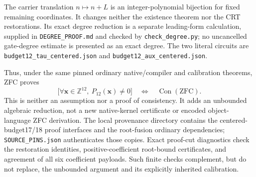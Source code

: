 The carrier translation $n\mapsto n+L$ is an integer-polynomial
bijection for fixed remaining coordinates.  It changes neither the
existence theorem nor the CRT restorations.  Its exact degree reduction
is a separate leading-form calculation, supplied in
\texttt{DEGREE\_PROOF.md} and checked by \texttt{check\_degree.py};
no uncancelled gate-degree estimate is presented as an exact degree.
The two literal circuits are \texttt{budget12\_tau\_centered.json}
and \texttt{budget12\_aux\_centered.json}.

Thus, under the same pinned ordinary native/compiler and calibration
theorems, ZFC proves
\[
 \bigl[\forall\mathbf x\in\mathbb Z^{12},\ P_{12}(\mathbf x)\ne0\bigr]
 \quad\Longleftrightarrow\quad \operatorname{Con}(\mathrm{ZFC}).
\]
This is neither an assumption nor a proof of consistency.  It adds an
unbounded algebraic reduction, not a new native-kernel certificate or
encoded object-language ZFC derivation.  The local provenance directory
contains the centered-budget17/18 proof interfaces and the root-fusion
ordinary dependencies; \texttt{SOURCE\_PINS.json} authenticates those
copies.  Exact proof-cut diagnostics check the restoration identities,
positive-coefficient root-bound certificates, and agreement of all six
coefficient payloads.  Such finite checks complement, but do not replace,
the unbounded argument and its explicitly inherited calibration.
